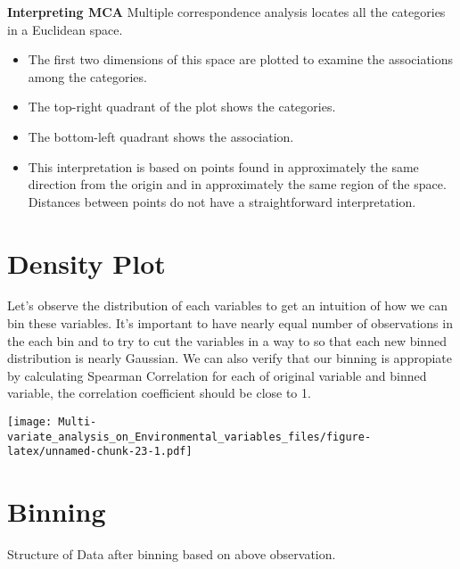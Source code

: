 \documentclass[]{book}
\providecommand{\tightlist}{%
  \setlength{\itemsep}{0pt}\setlength{\parskip}{0pt}}
\begin{document}
\textbf{Interpreting MCA} Multiple correspondence analysis locates all
the categories in a Euclidean space.

\begin{itemize}
\tightlist
\item
  The first two dimensions of this space are plotted to examine the
  associations among the categories.
\item
  The top-right quadrant of the plot shows the categories.
\item
  The bottom-left quadrant shows the association.
\item
  This interpretation is based on points found in approximately the same
  direction from the origin and in approximately the same region of the
  space. Distances between points do not have a straightforward
  interpretation.
\end{itemize}

\hypertarget{density-plot}{%
\section{Density Plot}\label{density-plot}}

Let's observe the distribution of each variables to get an intuition of
how we can bin these variables. It's important to have nearly equal
number of observations in the each bin and to try to cut the variables
in a way to so that each new binned distribution is nearly Gaussian. We
can also verify that our binning is appropiate by calculating Spearman
Correlation for each of original variable and binned variable, the
correlation coefficient should be close to 1.

\texttt{[image: Multi-variate\_analysis\_on\_Environmental\_variables\_files/figure-latex/unnamed-chunk-23-1.pdf]}

\hypertarget{binning}{%
\section{Binning}\label{binning}}

Structure of Data after binning based on above observation.
\end{document}
